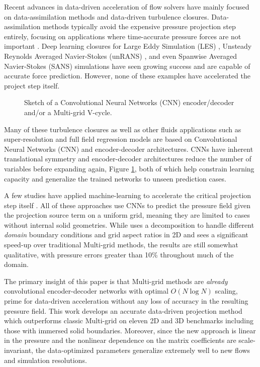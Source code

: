 \documentclass[review]{elsarticle}
\begin{document}
Recent advances in data-driven acceleration of flow solvers have mainly focused on data-assimilation methods and data-driven turbulence closures. Data-assimilation methods typically avoid the expensive pressure projection step entirely, focusing on applications where time-accurate pressure forces are not important \cite{asch2016data}. Deep learning closures for Large Eddy Simulation (LES) \cite{BECK2019108910,maulik_san_rasheed_vedula_2019}, Unsteady Reynolds Averaged Navier-Stokes (unRANS) \cite{ling_kurzawski_templeton_2016}, and even Spanwise Averaged Navier-Stokes (SANS) \cite{font2021deep} simulations have seen growing success and are capable of accurate force prediction. However, none of these examples have accelerated the project step itself.

\begin{figure}
    
    \caption{Sketch of a Convolutional Neural Networks (CNN) encoder/decoder and/or a Multi-grid V-cycle.}
    \label{fig:multigrid}
\end{figure}

Many of these turbulence closures as well as other fluids applications such as super-resolution \cite{ferdian20204dflownet,liu2020deep} and full field regression models \cite{duru2021cnnfoil,bhatnagar2019prediction} are based on Convolutional Neural Networks (CNN) and encoder-decoder architectures. CNNs have inherent translational symmetry and encoder-decoder architectures reduce the number of variables before expanding again, Figure \ref{fig:multigrid}, both of which help constrain learning capacity and generalize the trained networks to unseen prediction cases. 

A few studies have applied machine-learning to accelerate the critical projection step itself \cite{ozbay2021poisson,Xiao2020,ajuria2020}. All of these approaches use CNNs to predict the pressure field given the projection source term on a uniform grid, meaning they are limited to cases without internal solid geometries. While \cite{ozbay2021poisson} uses a decomposition to handle different \textit{domain} boundary conditions and grid aspect ratios in 2D and sees a significant speed-up over traditional Multi-grid methods, the results are still somewhat qualitative, with pressure errors greater than 10\% throughout much of the domain.

The primary insight of this paper is that Multi-grid methods are \textit{already} convolutional encoder-decoder networks with optimal $O(N\log N)$ scaling, prime for data-driven acceleration without any loss of accuracy in the resulting pressure field. This work develops an accurate data-driven projection method which outperforms classic Multi-grid on eleven 2D and 3D benchmarks including those with immersed solid boundaries. Moreover, since the new approach is linear in the pressure and the nonlinear dependence on the matrix coefficients are scale-invariant, the data-optimized parameters generalize extremely well to new flows and simulation resolutions.
\end{document}
